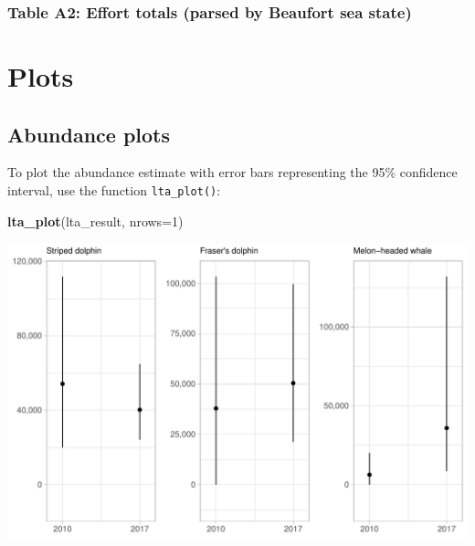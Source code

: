 \documentclass[
]{book}
\newenvironment{Shaded}{\begin{snugshade}}{\end{snugshade}}
\newcommand{\AttributeTok}[1]{\textcolor[rgb]{0.13,0.29,0.53}{#1}}
\newcommand{\ControlFlowTok}[1]{\textcolor[rgb]{0.13,0.29,0.53}{\textbf{#1}}}
\newcommand{\DecValTok}[1]{\textcolor[rgb]{0.00,0.00,0.81}{#1}}
\newcommand{\FunctionTok}[1]{\textcolor[rgb]{0.13,0.29,0.53}{\textbf{#1}}}
\newcommand{\NormalTok}[1]{#1}
\newcommand{\SpecialCharTok}[1]{\textcolor[rgb]{0.81,0.36,0.00}{\textbf{#1}}}
\newcommand{\StringTok}[1]{\textcolor[rgb]{0.31,0.60,0.02}{#1}}
\begin{document}
\hypertarget{table-a2-effort-totals-parsed-by-beaufort-sea-state}{%
\subsection*{Table A2: Effort totals (parsed by Beaufort sea state)}\label{table-a2-effort-totals-parsed-by-beaufort-sea-state}}

\begin{Shaded}
\end{Shaded}

\hypertarget{plots}{%
\chapter{Plots}\label{plots}}

\hypertarget{abundance-plots}{%
\section*{Abundance plots}\label{abundance-plots}}

To plot the abundance estimate with error bars representing the 95\% confidence interval, use the function \texttt{lta\_plot()}:

\begin{Shaded}
\begin{Highlighting}[]
\FunctionTok{lta\_plot}\NormalTok{(lta\_result, }
         \AttributeTok{nrows=}\DecValTok{1}\NormalTok{)}
\end{Highlighting}
\end{Shaded}

\includegraphics{figures/unnamed-chunk-323-1.pdf}
\end{document}
